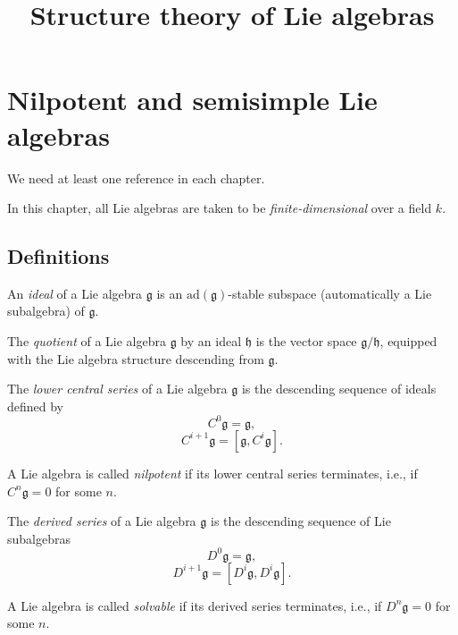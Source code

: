 

%


\title{Structure theory of Lie algebras}


\maketitle

\label{section-phantom}

\tableofcontents


\section{Nilpotent and semisimple Lie algebras}

We need at least one reference \cite{reference} in each chapter.

In this chapter, all Lie algebras are taken to be \emph{finite-dimensional} over a field $k$.

\subsection{Definitions}

\begin{definition}
 \label{definition-ideal}
An {\it ideal} of a Lie algebra $\mathfrak g$ is an $\text{ad}(\mathfrak g)$-stable subspace (automatically a Lie subalgebra) of $\mathfrak g$.

The {\it quotient} of a Lie algebra $\mathfrak g$ by an ideal $\mathfrak h$ is the vector space $\mathfrak g/\mathfrak h$, equipped with the Lie algebra structure descending from $\mathfrak g$.
\end{definition}



\begin{definition}
 \label{definition-nilpotent-solvable}
The {\it lower central series} of a Lie algebra $\mathfrak g$ is the descending sequence of ideals defined by
$$ C^0\mathfrak g = \mathfrak g,$$
$$ C^{i+1}\mathfrak g = [\mathfrak g, C^i\mathfrak g].$$
 
 
A Lie algebra is called {\it nilpotent} if its lower central series terminates, i.e., if $C^n\mathfrak g=0$ for some $n$.


The {\it derived series} of a Lie algebra $\mathfrak g$ is the descending sequence of Lie subalgebras
$$ D^0\mathfrak g = \mathfrak g,$$
$$ D^{i+1}\mathfrak g = [D^i\mathfrak g, D^i\mathfrak g].$$

A Lie algebra is called {\it solvable} if its derived series terminates, i.e., if $D^n\mathfrak g=0$ for some $n$.
\end{definition}

